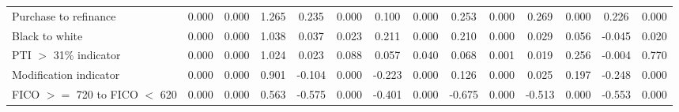 \begin{tabular}{l*{13}{c}}
\indent Purchase to refinance&       0.000&       0.000&       1.265&       0.235&       0.000&       0.100&       0.000&       0.253&       0.000&       0.269&       0.000&       0.226&       0.000\\
\indent Black to white&       0.000&       0.000&       1.038&       0.037&       0.023&       0.211&       0.000&       0.210&       0.000&       0.029&       0.056&      -0.045&       0.020\\
\indent PTI $>$ 31\% indicator&       0.000&       0.000&       1.024&       0.023&       0.088&       0.057&       0.040&       0.068&       0.001&       0.019&       0.256&      -0.004&       0.770\\
\indent Modification indicator&       0.000&       0.000&       0.901&      -0.104&       0.000&      -0.223&       0.000&       0.126&       0.000&       0.025&       0.197&      -0.248&       0.000\\
\indent FICO $>=$ 720 to FICO $<$ 620&       0.000&       0.000&       0.563&      -0.575&       0.000&      -0.401&       0.000&      -0.675&       0.000&      -0.513&       0.000&      -0.553&       0.000\\
\hline\hline
\end{tabular}
